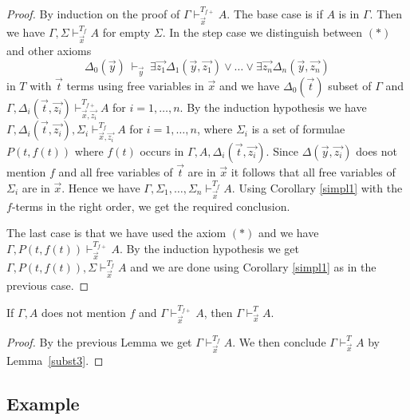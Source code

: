 \documentclass[10pt,a4paper]{article}
\begin{document}
\begin{proof}
By induction on the proof of $\Gamma\vdash_{\vec{x}}^{T_{f{+}}} A$.
The base case is if $A$ is in $\Gamma$. Then we have
$\Gamma,\Sigma\vdash_{\vec{x}}^{T_f} A$ for empty $\Sigma$.
In the step case we distinguish between $(*)$ and other axioms
$$
\Delta_0(\vec{y})~\vdash_{\vec{y}}~
\exists \vec{z_1}\Delta_1(\vec{y},\vec{z_1})\vee\dots\vee\exists \vec{z_n}\Delta_n(\vec{y},\vec{z_n})
$$
in $T$ with $\vec{t}$ terms using free variables in $\vec{x}$ and
we have $\Delta_0(\vec{t})$ subset of $\Gamma$ and
$\Gamma,\Delta_i(\vec{t},\vec{z_i})\vdash_{\vec{x},\vec{z_i}}^{T_{f{+}}} A$ for $i=1,\dots,n$.
By the induction hypothesis we have $\Gamma,\Delta_i(\vec{t},\vec{z_i}), \Sigma_i\vdash_{\vec{x},\vec{z_i}}^{T_f} A$
for $i = 1,\dots,n$, where $\Sigma_i$ is a set of formulae $P(t,f(t))$ where
$f(t)$ occurs in $\Gamma,A,\Delta_i(\vec{t},\vec{z_i})$.
Since $\Delta(\vec{y},\vec{z_i})$ does not mention $f$ and all free variables of $\vec{t}$ are
in $\vec{x}$ it follows that all free variables of $\Sigma_i$ are in $\vec{x}$.
Hence we have $\Gamma,\Sigma_1,\dots,\Sigma_n\vdash_{\vec{x}}^{T_f} A$.
Using Corollary \ref{simpl1} with the $f$-terms in the right order, 
we get the required conclusion.

The last case is that we have used the axiom $(*)$ and
we have $\Gamma,P(t,f(t))\vdash_{\vec{x}}^{T_{f{+}}} A$. By the induction hypothesis we get
$\Gamma,P(t,f(t)),\Sigma \vdash_{\vec{x}}^{T_f} A$ and we are
done using Corollary \ref{simpl1} as in the previous case.
\end{proof}

\begin{theorem}\label{thm:skolem}
If $\Gamma,A$ does not mention $f$ and $\Gamma\vdash_{\vec{x}}^{T_{f{+}}} A$, then
$\Gamma\vdash_{\vec{x}}^T A$.
\end{theorem}

\begin{proof}
By the previous Lemma we get $\Gamma\vdash_{\vec{x}}^{T_f} A$. We then conclude
$\Gamma\vdash_{\vec{x}}^T A$ by Lemma~\ref{subst3}.
\end{proof}

\subsection{Example}
\end{document}
